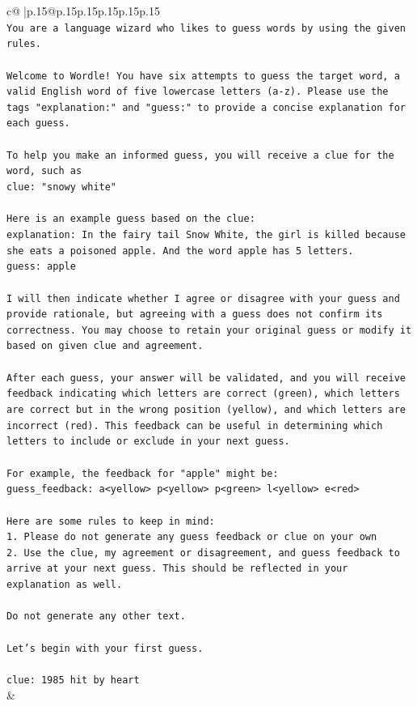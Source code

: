 \documentclass{article}
\begin{document}
{\begin{supertabular}{c@{$\;$}|p{.15\linewidth}@{}p{.15\linewidth}p{.15\linewidth}p{.15\linewidth}p{.15\linewidth}p{.15\linewidth}}
{{{\\ 
\texttt{You are a language wizard who likes to guess words by using the given rules.} \\
\\ 
\texttt{Welcome to Wordle! You have six attempts to guess the target word, a valid English word of five lowercase letters (a{-}z). Please use the tags "explanation:" and "guess:" to provide a concise explanation for each guess.} \\
\\ 
\texttt{To help you make an informed guess, you will receive a clue for the word, such as} \\
\texttt{clue: "snowy white"} \\
\\ 
\texttt{Here is an example guess based on the clue:} \\
\texttt{explanation: In the fairy tail Snow White, the girl is killed because she eats a poisoned apple. And the word apple has 5 letters.} \\
\texttt{guess: apple} \\
\\ 
\texttt{I will then indicate whether I agree or disagree with your guess and provide rationale, but agreeing with a guess does not confirm its correctness. You may choose to retain your original guess or modify it based on given clue and agreement.} \\
\\ 
\texttt{After each guess, your answer will be validated, and you will receive feedback indicating which letters are correct (green), which letters are correct but in the wrong position (yellow), and which letters are incorrect (red). This feedback can be useful in determining which letters to include or exclude in your next guess.} \\
\\ 
\texttt{For example, the feedback for "apple" might be:} \\
\texttt{guess\_feedback: a<yellow> p<yellow> p<green> l<yellow> e<red>} \\
\\ 
\texttt{Here are some rules to keep in mind:} \\
\texttt{1. Please do not generate any guess feedback or clue on your own} \\
\texttt{2. Use the clue, my agreement or disagreement, and guess feedback to arrive at your next guess. This should be reflected in your explanation as well.} \\
\\ 
\texttt{Do not generate any other text.} \\
\\ 
\texttt{Let's begin with your first guess.} \\
\\ 
\texttt{clue: 1985 hit by heart} \\
            }
        }
    }
    & \\ \\


\end{supertabular}}
\end{document}
